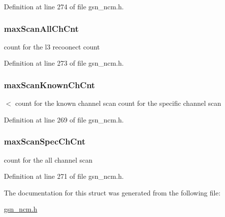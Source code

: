 Definition at line 274 of file gsn\_\-ncm.h.

\hypertarget{a00161_a9ac27e73f1305dafb17c2ad990126582}{
\subsubsection[{maxScanAllChCnt}]{ {\bf maxScanAllChCnt}}}
\label{a00161_a9ac27e73f1305dafb17c2ad990126582}
count for the l3 recoonect count 

Definition at line 273 of file gsn\_\-ncm.h.

\hypertarget{a00161_ad361089d17f0839dacdf9c914a6cffc6}{
\subsubsection[{maxScanKnownChCnt}]{ {\bf maxScanKnownChCnt}}}
\label{a00161_ad361089d17f0839dacdf9c914a6cffc6}
$<$ count for the known channel scan count for the specific channel scan 

Definition at line 269 of file gsn\_\-ncm.h.

\hypertarget{a00161_a40d4d12f85e32539a445513954beb0b2}{
\subsubsection[{maxScanSpecChCnt}]{ {\bf maxScanSpecChCnt}}}
\label{a00161_a40d4d12f85e32539a445513954beb0b2}
count for the all channel scan 

Definition at line 271 of file gsn\_\-ncm.h.



The documentation for this struct was generated from the following file:\begin{DoxyCompactItemize}
\item 
\hyperlink{a00529}{gsn\_\-ncm.h}\end{DoxyCompactItemize}

